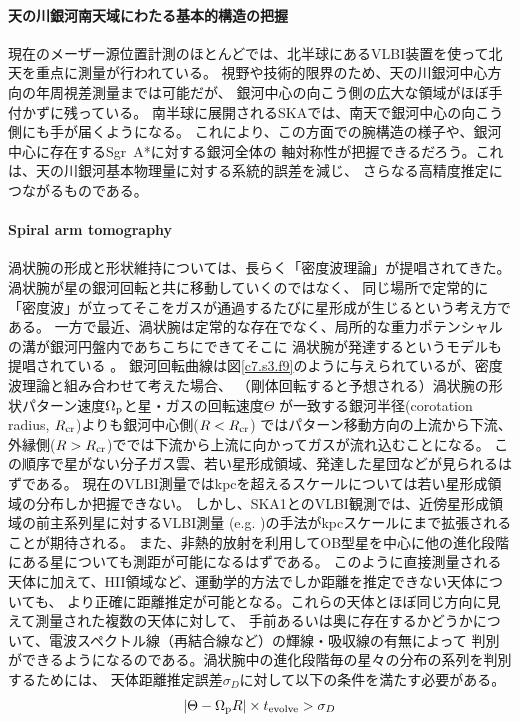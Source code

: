 \paragraph{天の川銀河南天域にわたる基本的構造の把握}
現在のメーザー源位置計測のほとんどでは、北半球にあるVLBI装置を使って北天を重点に測量が行われている。
視野や技術的限界のため、天の川銀河中心方向の年周視差測量までは可能だが、
銀河中心の向こう側の広大な領域がほぼ手付かずに残っている。
南半球に展開されるSKAでは、南天で銀河中心の向こう側にも手が届くようになる。
これにより、この方面での腕構造の様子や、銀河中心に存在するSgr~A*に対する銀河全体の
軸対称性が把握できるだろう。これは、天の川銀河基本物理量に対する系統的誤差を減じ、
さらなる高精度推定につながるものである。

\paragraph{Spiral arm tomography}
渦状腕の形成と形状維持については、長らく「密度波理論」が提唱されてきた\citep{1964ApJ...140..646L}。
渦状腕が星の銀河回転と共に移動していくのではなく、
同じ場所で定常的に「密度波」が立ってそこをガスが通過するたびに星形成が生じるという考え方である。
一方で最近、渦状腕は定常的な存在でなく、局所的な重力ポテンシャルの溝が銀河円盤内であちこちにできてそこに
渦状腕が発達するというモデルも提唱されている\citep{2009ApJ...706..471B} 。
銀河回転曲線は図\ref{c7.s3.f9}のように与えられているが、密度波理論と組み合わせて考えた場合、
（剛体回転すると予想される）渦状腕の形状パターン速度$\Omega_{\rm p}$と星・ガスの回転速度$\Theta$
が一致する銀河半径(corotation radius, $R_{\rm cr}$)よりも銀河中心側($R<R_{\rm cr}$)
ではパターン移動方向の上流から下流、
外縁側($R>R_{\rm cr}$)ででは下流から上流に向かってガスが流れ込むことになる。
この順序で星がない分子ガス雲、若い星形成領域、発達した星団などが見られるはずである。
現在のVLBI測量ではkpcを超えるスケールについては若い星形成領域の分布しか把握できない。
しかし、SKA1とのVLBI観測では、近傍星形成領域の前主系列星に対するVLBI測量
(e.g. \citealt{2013IAUS..289...36L} )の手法がkpcスケールにまで拡張されることが期待される。
また、非熱的放射を利用してOB型星を中心に他の進化段階にある星についても測距が可能になるはずである。
このように直接測量される天体に加えて、HII領域など、運動学的方法でしか距離を推定できない天体についても、
より正確に距離推定が可能となる。これらの天体とほぼ同じ方向に見えて測量された複数の天体に対して、
手前あるいは奥に存在するかどうかについて、電波スペクトル線（再結合線など）の輝線・吸収線の有無によって
判別ができるようになるのである。渦状腕中の進化段階毎の星々の分布の系列を判別するためには、
天体距離推定誤差$\sigma_{D}$に対して以下の条件を満たす必要がある。
\begin{equation}
\left|\Theta - \Omega_{\rm p}R\right| \times t_{\rm evolve}>\sigma_D
\label{eq:density-wave}
\end{equation}

